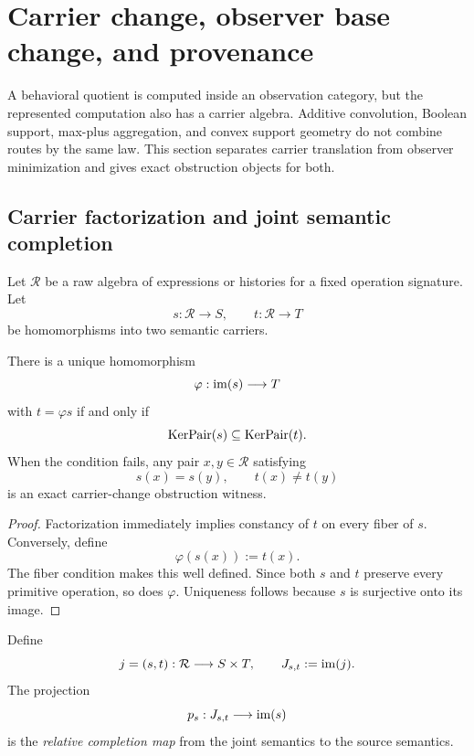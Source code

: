 \section{Carrier change, observer base change, and provenance}
\label{sec:block18-carrier-observer}

A behavioral quotient is computed inside an observation category, but the represented computation also has a carrier algebra.  Additive convolution, Boolean support, max-plus aggregation, and convex support geometry do not combine routes by the same law.  This section separates carrier translation from observer minimization and gives exact obstruction objects for both.

\subsection{Carrier factorization and joint semantic completion}
\label{subsec:block18-carrier-factorization}

Let \(\mathcal R\) be a raw algebra of expressions or histories for a fixed operation signature.  Let
\[
 s:\mathcal R\longrightarrow S,
 \qquad
 t:\mathcal R\longrightarrow T
\]
be homomorphisms into two semantic carriers.

\begin{theorem}
\label{thm:block18-carrier-factorization}
There is a unique homomorphism
\[
 \varphi:\operatorname{im}(s)\longrightarrow T
\]
with \(t=\varphi s\) if and only if
\[
 \operatorname{KerPair}(s)\subseteq\operatorname{KerPair}(t).
\]
When the condition fails, any pair \(x,y\in\mathcal R\) satisfying
\[
 s(x)=s(y),
 \qquad
 t(x)\neq t(y)
\]
is an exact carrier-change obstruction witness.
\end{theorem}

\begin{proof}
Factorization immediately implies constancy of \(t\) on every fiber of \(s\).  Conversely, define
\[
 \varphi(s(x)):=t(x).
\]
The fiber condition makes this well defined.  Since both \(s\) and \(t\) preserve every primitive operation, so does \(\varphi\).  Uniqueness follows because \(s\) is surjective onto its image.
\end{proof}

\begin{definition}
\label{def:block18-joint-completion}
Define
\[
 j=(s,t):\mathcal R\longrightarrow S\times T,
 \qquad
 J_{s,t}:=\operatorname{im}(j).
\]
The projection
\[
 p_s:J_{s,t}\longrightarrow\operatorname{im}(s)
\]
is the \emph{relative completion map} from the joint semantics to the source semantics.
\end{definition}

